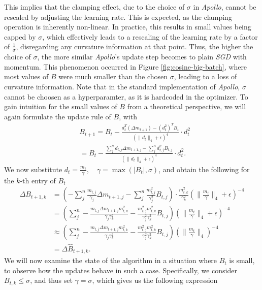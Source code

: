 This implies that the clamping effect, due to the choice of $\sigma$ in \emph{Apollo}, cannot be rescaled by adjusting the learning rate. 
This is expected, as the clamping operation is inherently non-linear.
In practice, this results in small values being capped by $\sigma$, which effectively leads to a rescaling of the learning rate by a 
factor of $\frac{1}{\sigma}$, disregarding any curvature information at that point. Thus, the higher the choice of $\sigma$,
the more similar \emph{Apollo}'s update step becomes to plain \emph{SGD} with momentum.
This phenomenon occurred in Figure \ref{fig:cosine-big-batch}, where most values of $B$ were much smaller than the chosen $\sigma$,
leading to a loss of curvature information.
Note that in the standard implementation of \emph{Apollo}, $\sigma$ cannot be choosen as a hyperparamter, as it is hardcoded in the optimizer.
To gain intuition for the small values of $B$ from a theoretical perspective, we will again formulate the update rule of $B$, with
\begin{align}
    &B_{t+1} =  B_t - \frac{d_t^T (\Delta m_{t+1}) - (d_t^2)^T B_t}{\left( \|d_t\|_4 + \epsilon \right)^4} \cdot d_t^2 \\
    &= B_t - \frac{\sum^n_j{d_{t,j}\Delta m_{t+1,j} - \sum^n_j{d_{t,j}^2 B_{t,j} }}}{\left( \|d_t\|_4 + \epsilon \right)^4} \cdot d_t^2.
\end{align}
We now substitute $d_t = \frac{m_t}{\gamma}, \quad \gamma = \max(|B_t|, \sigma)$, and obtain the following for the $k$-th entry of $B_t$
\begin{align*}
    \Delta B_{t+1,k} &=\left(-\displaystyle\sum^n_j \frac{m_{t,j}}{\gamma_j } \Delta m_{t+1,j} - \displaystyle\sum^n_j \frac{m_{t,j}^2}{\gamma_j ^2} B_{t,j}\right) \cdot \frac{m_{t,k}^2}{\gamma_k^2} \left( \|\frac{m_t}{\gamma}\|_4 + \epsilon \right)^{-4}  \\
    &= \left(\displaystyle\sum^n_j -\frac{m_{t,j}\Delta m_{t+1,j}m_{t,k}^2}{\gamma_j \gamma_k^2} - \frac{m_{t,j}^2m_{t,k}^2}{\gamma_j ^2\gamma_k^2} B_{t,j}\right) \left( \|\frac{m_t}{\gamma}\|_4 + \epsilon \right)^{-4}  \\
    &\approx \left(\displaystyle\sum^n_j -\frac{m_{t,j}\Delta m_{t+1,j}m_{t,k}^2}{\gamma_j \gamma_k^2} - \frac{m_{t,j}^2m_{t,k}^2}{\gamma_j ^2\gamma_k^2} B_{t,j}\right) \left( \|\frac{m_t}{\gamma}\|_4\right)^{-4}  \\
    &=  \Delta \hat{B}_{t+1,k}.
\end{align*}
We will now examine the state of the algorithm in a situation where $B_t$ is small, to observe how the updates behave in such a case.
Specifically, we consider $B_{t,k} \leq \sigma$, and thus set $\gamma = \sigma$, which gives us the following expression

